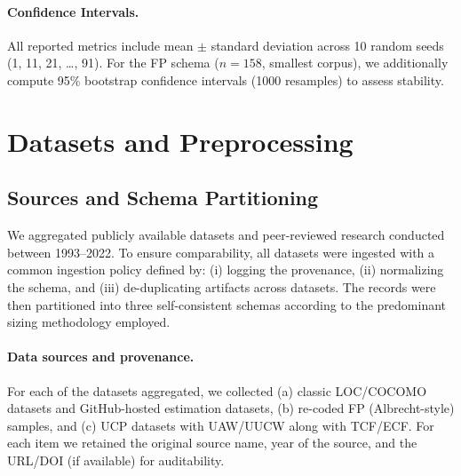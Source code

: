 \documentclass[11pt,a4paper]{article}
\begin{document}
\paragraph{Confidence Intervals.}
All reported metrics include mean $\pm$ standard deviation across 10 random seeds (1, 11, 21, \ldots, 91). For the FP schema ($n=158$, smallest corpus), we additionally compute 95\% bootstrap confidence intervals (1000 resamples) to assess stability.

\section{Datasets and Preprocessing}
\subsection{Sources and Schema Partitioning}
We aggregated publicly available datasets and peer-reviewed research conducted between 1993--2022. 
To ensure comparability, all datasets were ingested with a common ingestion policy defined by: 
(i) logging the provenance, (ii) normalizing the schema, and (iii) de-duplicating artifacts across datasets. 
The records were then partitioned into three self-consistent schemas according to the predominant sizing methodology employed.

\paragraph{Data sources and provenance.}
For each of the datasets aggregated, we collected 
(a) classic LOC/COCOMO datasets and GitHub-hosted estimation datasets, 
(b) re-coded FP (Albrecht-style) samples, and 
(c) UCP datasets with UAW/UUCW along with TCF/ECF. 
For each item we retained the original source name, year of the source, and the URL/DOI (if available) for auditability.
\end{document}
